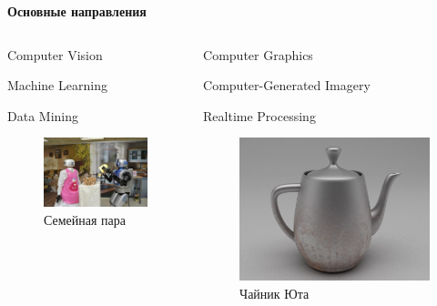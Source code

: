 \documentclass{beamer}
\begin{document}
	\begin{frame}
		
		\centering
		\textbf{Основные направления}
		
		\begin{columns}
			\begin{column}{0.3\textwidth}
				
				Computer Vision
				
				Machine Learning
				
				Data Mining
				\begin{figure}
				\includegraphics[width=\textwidth]{images/Computer_vision.png}
				\caption{Семейная пара}
				\end{figure}
			\end{column}
			
			\begin{column}{0.4\textwidth}
				
				Computer Graphics
				
				Computer-Generated Imagery
				
				Realtime Processing
				\begin{figure}
				\includegraphics[width=\textwidth]{images/Utah_teapot.png}
				\caption{Чайник Юта}
				\end{figure}
				

\end{column}
\end{columns}
\end{frame}
\end{document}
